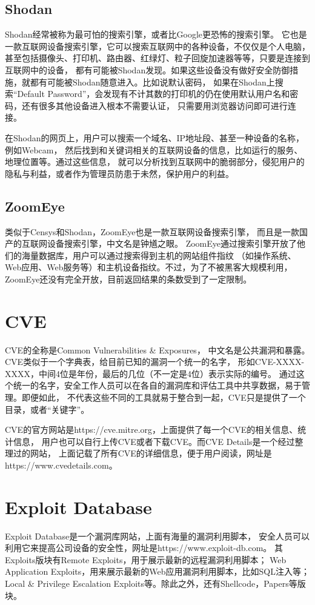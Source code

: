 \subsection{Shodan\cite{matherly2009shodan}}
\label{sec:Shodan}

Shodan经常被称为最可怕的搜索引擎，或者比Google更恐怖的搜索引擎。
它也是一款互联网设备搜索引擎，它可以搜索互联网中的各种设备，不仅仅是个人电脑，
甚至包括摄像头、打印机、路由器、红绿灯、粒子回旋加速器等等，只要是连接到互联网中的设备，
都有可能被Shodan发现。如果这些设备没有做好安全防御措施，就都有可能被Shodan随意进入。比如说默认密码，
如果在Shodan上搜索“Default Password”，会发现有不计其数的打印机的仍在使用默认用户名和密码，还有很多其他设备进入根本不需要认证，
只需要用浏览器访问即可进行连接。

在Shodan的网页上，用户可以搜索一个域名、IP地址段、甚至一种设备的名称，例如Webcam，
然后找到和关键词相关的互联网设备的信息，比如运行的服务、地理位置等。通过这些信息，
就可以分析找到互联网中的脆弱部分，侵犯用户的隐私与利益，或者作为管理员防患于未然，保护用户的利益。

\subsection{ZoomEye}
\label{sec:ZoomEye}

类似于Censys和Shodan，ZoomEye也是一款互联网设备搜索引擎，
而且是一款国产的互联网设备搜索引擎，中文名是钟馗之眼。
ZoomEye通过搜索引擎开放了他们的海量数据库，用户可以通过搜索得到主机的网站组件指纹
（如操作系统、Web应用、Web服务等）和主机设备指纹。不过，为了不被黑客大规模利用，
ZoomEye还没有完全开放，目前返回结果的条数受到了一定限制。

\section{CVE}
\label{sec:CVE}

CVE的全称是Common Vulnerabilities \& Exposures，
中文名是公共漏洞和暴露。CVE类似于一个字典表，给目前已知的漏洞一个统一的名字，
形如CVE-XXXX-XXXX，中间4位是年份，最后的几位（不一定是4位）表示实际的编号。
通过这个统一的名字，安全工作人员可以在各自的漏洞库和评估工具中共享数据，易于管理。即便如此，
不代表这些不同的工具就易于整合到一起，CVE只是提供了一个目录，或者“关键字”。

CVE的官方网站是https://cve.mitre.org，上面提供了每一个CVE的相关信息、统计信息，
用户也可以自行上传CVE或者下载CVE。而CVE Details是一个经过整理过的网站，
上面记载了所有CVE的详细信息，便于用户阅读，网址是https://www.cvedetails.com。

\section{Exploit Database\cite{singh2015breaking}}
\label{sec:Exploit-Database}

Exploit Database是一个漏洞库网站，上面有海量的漏洞利用脚本，
安全人员可以利用它来提高公司设备的安全性，网址是https://www.exploit-db.com。
其Exploits版块有Remote Exploits，用于展示最新的远程漏洞利用脚本；
Web Application Exploits，用来展示最新的Web应用漏洞利用脚本，比如SQL注入等；
Local \& Privilege Escalation Exploits等。除此之外，还有Shellcode，Papers等版块。

